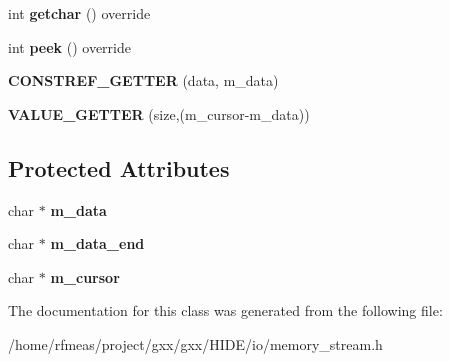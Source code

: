\begin{DoxyCompactItemize}
\item 
int {\bfseries getchar} () override\hypertarget{classgxx_1_1memory__stream_a77494047dab60c769d2642874759b509}{}\label{classgxx_1_1memory__stream_a77494047dab60c769d2642874759b509}

\item 
int {\bfseries peek} () override\hypertarget{classgxx_1_1memory__stream_a819b313dc0ed540496d6e87f31f69291}{}\label{classgxx_1_1memory__stream_a819b313dc0ed540496d6e87f31f69291}

\item 
{\bfseries C\+O\+N\+S\+T\+R\+E\+F\+\_\+\+G\+E\+T\+T\+ER} (data, m\+\_\+data)\hypertarget{classgxx_1_1memory__stream_a3912fe6d973b5e9b50dde14a4283c136}{}\label{classgxx_1_1memory__stream_a3912fe6d973b5e9b50dde14a4283c136}

\item 
{\bfseries V\+A\+L\+U\+E\+\_\+\+G\+E\+T\+T\+ER} (size,(m\+\_\+cursor-\/m\+\_\+data))\hypertarget{classgxx_1_1memory__stream_ae4da697dfcc2e3bc24f3d12cac912631}{}\label{classgxx_1_1memory__stream_ae4da697dfcc2e3bc24f3d12cac912631}

\end{DoxyCompactItemize}
\subsection*{Protected Attributes}
\begin{DoxyCompactItemize}
\item 
char $\ast$ {\bfseries m\+\_\+data}\hypertarget{classgxx_1_1memory__stream_a760d7259c60584527a8d041b7139c9eb}{}\label{classgxx_1_1memory__stream_a760d7259c60584527a8d041b7139c9eb}

\item 
char $\ast$ {\bfseries m\+\_\+data\+\_\+end}\hypertarget{classgxx_1_1memory__stream_a78cb51250f0832ba6ad4b1e074f2b042}{}\label{classgxx_1_1memory__stream_a78cb51250f0832ba6ad4b1e074f2b042}

\item 
char $\ast$ {\bfseries m\+\_\+cursor}\hypertarget{classgxx_1_1memory__stream_a3ec994db0f89f628a9dc6bbd0addefdf}{}\label{classgxx_1_1memory__stream_a3ec994db0f89f628a9dc6bbd0addefdf}

\end{DoxyCompactItemize}


The documentation for this class was generated from the following file\+:\begin{DoxyCompactItemize}
\item 
/home/rfmeas/project/gxx/gxx/\+H\+I\+D\+E/io/memory\+\_\+stream.\+h\end{DoxyCompactItemize}
